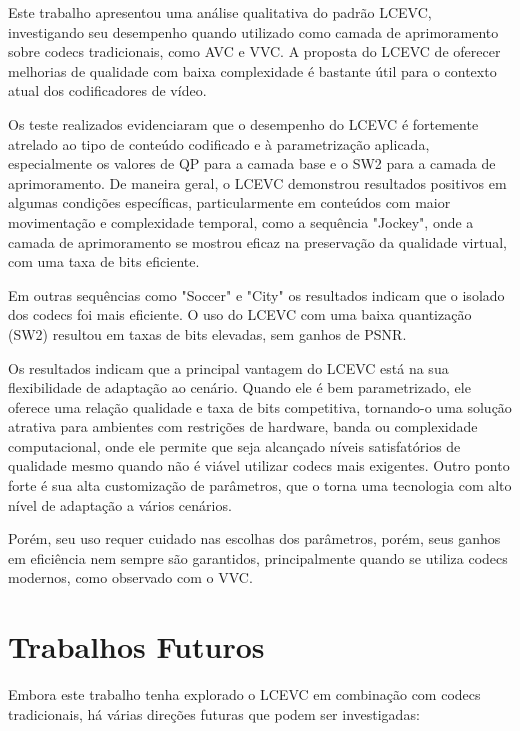 Este trabalho apresentou uma análise qualitativa do padrão \acrfull{LCEVC},
investigando seu desempenho quando utilizado como camada de aprimoramento sobre
codecs tradicionais, como \acrshort{AVC} e \acrshort{VVC}. A proposta do 
\acrshort{LCEVC} de oferecer melhorias de qualidade com baixa complexidade
é bastante útil para o contexto atual dos codificadores de vídeo.

Os teste realizados evidenciaram que o desempenho do \acrshort{LCEVC} é 
fortemente atrelado ao tipo de conteúdo codificado e à parametrização
aplicada, especialmente os valores de QP para a camada base e o SW2
para a camada de aprimoramento. De maneira geral, o \acrshort{LCEVC}
demonstrou resultados positivos em algumas condições específicas,
particularmente em conteúdos com maior movimentação e complexidade
temporal, como a sequência "Jockey", onde a camada de aprimoramento
se mostrou eficaz na preservação da qualidade virtual, com uma taxa de bits
eficiente.

Em outras sequências como "Soccer" e "City" os resultados indicam que
o isolado dos codecs foi mais eficiente. O uso do \acrshort{LCEVC} com
uma baixa quantização (SW2) resultou em taxas de bits elevadas, sem ganhos
de \acrshort{PSNR}.

Os resultados indicam que a principal vantagem do \acrshort{LCEVC} está
na sua flexibilidade de adaptação ao cenário. Quando ele é bem parametrizado,
ele oferece uma relação qualidade e taxa de bits competitiva, tornando-o uma
solução atrativa para ambientes com restrições de hardware, banda ou complexidade
computacional, onde ele permite que seja alcançado níveis satisfatórios de qualidade
mesmo quando não é viável utilizar codecs mais exigentes. Outro ponto forte é sua
alta customização de parâmetros, que o torna uma tecnologia com alto nível de
adaptação a vários cenários. 

Porém, seu uso requer cuidado nas escolhas dos parâmetros, porém, seus ganhos em eficiência nem sempre
são garantidos, principalmente quando se utiliza codecs modernos, como observado
com o \acrshort{VVC}.

\section{Trabalhos Futuros}

Embora este trabalho tenha explorado o \acrshort{LCEVC} em combinação com codecs
tradicionais, há várias direções futuras que podem ser investigadas:


